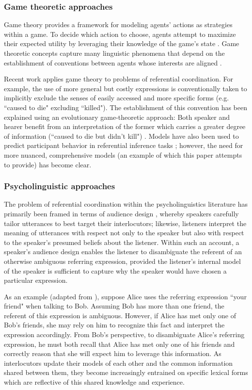 \documentclass[a4paper,11pt]{article}
\begin{document}
\subsubsection{Game theoretic approaches}
Game theory provides a framework for modeling agents' actions as strategies within a game. To decide which action to choose, agents attempt to maximize their expected utility by leveraging their knowledge of the game's state \cite{benz2005}. Game theoretic concepts capture many linguistic phenomena that depend on the establishment of conventions between agents whose interests are aligned \cite{lewis1969}.

Recent work applies game theory to problems of referential coordination. For example, the use of more general but costly expressions is conventionally taken to implicitly exclude the senses of easily accessed and more specific forms (e.g. ``caused to die" excluding ``killed"). The establishment of this convention has been explained using an evolutionary game-theoretic approach: Both speaker and hearer benefit from an interpretation of the former which carries a greater degree of information (``caused to die but didn't kill") \cite{benz2005}. Models have also been used to predict participant behavior in referential inference tasks \cite{degen2012}; however, the need for more nuanced, comprehensive models (an example of which this paper attempts to provide) has become clear. 

\subsubsection{Psycholinguistic approaches}
The problem of referential coordination within the psycholinguistics literature has primarily been framed in terms of audience design \cite{clark1982}, whereby speakers carefully tailor utterances to best target their interlocutors; likewise, listeners interpret the meaning of utterances with respect not only to the speaker but also with respect to the speaker's presumed beliefs about the listener. Within such an account, a speaker's audience design enables the listener to disambiguate the referent of an otherwise ambiguous referring expression, provided the listener's internal model of the speaker is sufficient to capture why the speaker would have chosen a particular expression. 

As an example (adapted from \citeauthor{clark1982}), suppose Alice uses the referring expression ``your friend" when talking to Bob. Assuming Bob has more than one friend, the referent of this expression is ambiguous. However, if Alice has met only one of Bob's friends, she may rely on him to recognize this fact and interpret the expression accordingly. From Bob's perspective, to disambiguate Alice's referring expression, he must both recall that Alice has met only one of his friends and correctly reason that she will expect him to leverage this information. As interlocutors update their models of each other and the common information shared between them, they become increasingly entrained on specific lexical forms which are reflective of this shared knowledge and experience.
\end{document}
